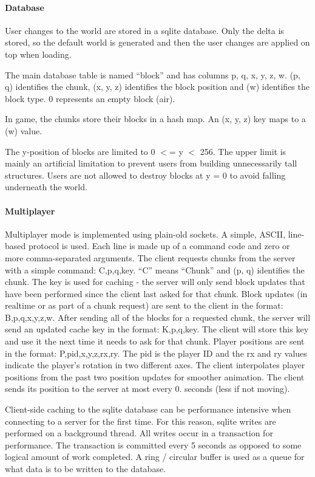 \paragraph*{Database}

User changes to the world are stored in a sqlite database. Only the delta is stored, so the default world is generated and then the user changes are applied on top when loading.

The main database table is named “block” and has columns p, q, x, y, z, w. (p, q) identifies the chunk, (x, y, z) identifies the block position and (w) identifies the block type. 0 represents an empty block (air).

In game, the chunks store their blocks in a hash map. An (x, y, z) key maps to a (w) value.

The y-\/position of blocks are limited to 0 $<$= y $<$ 256. The upper limit is mainly an artificial limitation to prevent users from building unnecessarily tall structures. Users are not allowed to destroy blocks at y = 0 to avoid falling underneath the world.

\paragraph*{Multiplayer}

Multiplayer mode is implemented using plain-\/old sockets. A simple, A\+S\+C\+II, line-\/based protocol is used. Each line is made up of a command code and zero or more comma-\/separated arguments. The client requests chunks from the server with a simple command\+: C,p,q,key. “\+C” means “\+Chunk” and (p, q) identifies the chunk. The key is used for caching -\/ the server will only send block updates that have been performed since the client last asked for that chunk. Block updates (in realtime or as part of a chunk request) are sent to the client in the format\+: B,p,q,x,y,z,w. After sending all of the blocks for a requested chunk, the server will send an updated cache key in the format\+: K,p,q,key. The client will store this key and use it the next time it needs to ask for that chunk. Player positions are sent in the format\+: P,pid,x,y,z,rx,ry. The pid is the player ID and the rx and ry values indicate the player’s rotation in two different axes. The client interpolates player positions from the past two position updates for smoother animation. The client sends its position to the server at most every 0. seconds (less if not moving).

Client-\/side caching to the sqlite database can be performance intensive when connecting to a server for the first time. For this reason, sqlite writes are performed on a background thread. All writes occur in a transaction for performance. The transaction is committed every 5 seconds as opposed to some logical amount of work completed. A ring / circular buffer is used as a queue for what data is to be written to the database.

